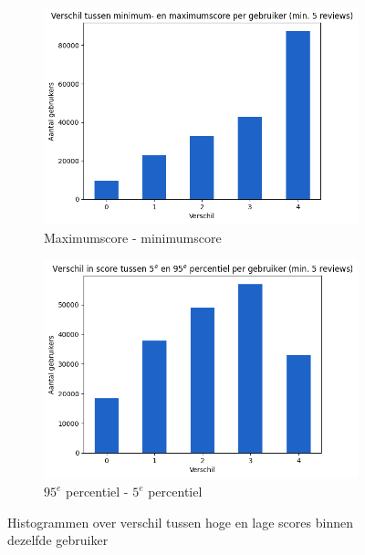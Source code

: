 \begin{figure}[H]
    \begin{subfigure}{.5\textwidth}
        \centering
        \includegraphics[width=1\linewidth]{fig/chapt3/verdeling_score_min_max.png}
        \caption{Maximumscore - minimumscore}
        \label{fig:chapt3_verdeling_score_min_max}
    \end{subfigure}
    \begin{subfigure}{.5\textwidth}
        \centering
        \includegraphics[width=1\linewidth]{fig/chapt3/verdeling_score_min_max_percentiel.png}
        \caption{$95^e$ percentiel - $5^e$ percentiel}
        \label{fig:chapt3_verdeling_score_min_max_percentiel}
    \end{subfigure}
    \caption{Histogrammen over verschil tussen hoge en lage scores binnen dezelfde gebruiker}
    \label{fig:chapt3_verdeling_score_min_max_combined}
\end{figure}


